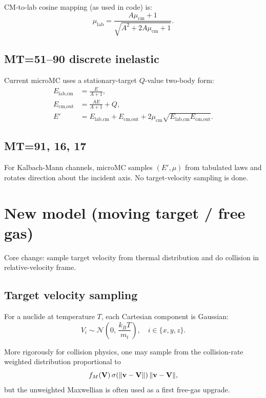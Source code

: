 \documentclass[11pt]{article}
\begin{document}
CM-to-lab cosine mapping (as used in code) is:
\begin{equation}
  \mu_{\text{lab}} = \frac{A\mu_{\text{cm}}+1}{\sqrt{A^2+2A\mu_{\text{cm}}+1}}.
\end{equation}

\subsection{MT=51--90 discrete inelastic}
Current microMC uses a stationary-target $Q$-value two-body form:
\begin{align}
  E_{\text{lab,cm}} &= \frac{E}{A+1}, \\
  E_{\text{cm,out}} &= \frac{AE}{A+1} + Q, \\
  E' &= E_{\text{lab,cm}} + E_{\text{cm,out}} + 2\mu_{\text{cm}}\sqrt{E_{\text{lab,cm}}E_{\text{cm,out}}}.
\end{align}

\subsection{MT=91, 16, 17}
For Kalbach-Mann channels, microMC samples $(E',\mu)$ from tabulated laws and rotates direction about the incident axis. No target-velocity sampling is done.

\section{New model (moving target / free gas)}
Core change: sample target velocity from thermal distribution and do collision in relative-velocity frame.

\subsection{Target velocity sampling}
For a nuclide at temperature $T$, each Cartesian component is Gaussian:
\begin{equation}
  V_i \sim \mathcal{N}\!\left(0,\,\frac{k_B T}{m_t}\right),\quad i\in\{x,y,z\}.
\end{equation}

More rigorously for collision physics, one may sample from the collision-rate weighted distribution proportional to
\begin{equation}
  f_M(\vb{V})\,\sigma(\norm{\vb{v}-\vb{V}})\,\norm{\vb{v}-\vb{V}},
\end{equation}
but the unweighted Maxwellian is often used as a first free-gas upgrade.
\end{document}
